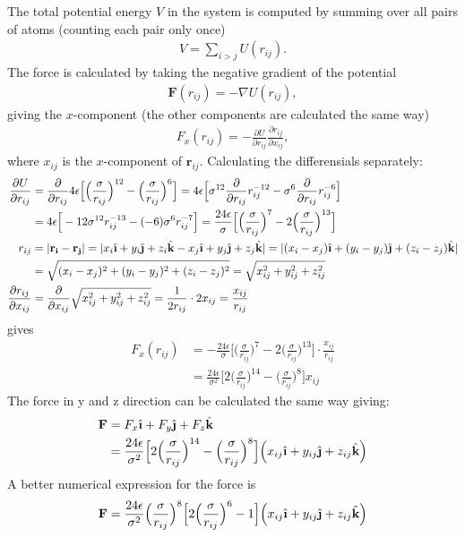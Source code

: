 \documentclass[11pt,a4wide]{article}
\renewcommand{\vec}{\mathbf}
\newcommand{\ihat}{\hat{\textbf{\i}}}
\newcommand{\jhat}{\hat{\textbf{\j}}}
\newcommand{\khat}{\hat{\textbf{k}}}
\begin{document}
The total potential energy $V$ in the system is computed by summing over all pairs of atoms (counting each pair only once)
\begin{align}
	V = \sum_{i>j} U(r_{ij}).
\end{align}
The force is calculated by taking the negative gradient of the potential
\begin{align}
	\vec F(r_{ij}) = -\nabla U(r_{ij}),
\end{align}
giving the $x$-component (the other components are calculated the same way)
\begin{align}
	F_x(r_{ij}) = -\frac{\partial U}{\partial r_{ij}}\frac{\partial r_{ij}}{\partial x_{ij}},
\end{align}
where $x_{ij}$ is the $x$-component of $\vec r_{ij}$. Calculating the differensials separately:
\begin{align*}
\frac{\partial U}{\partial r_{ij}} &= \frac{\partial }{\partial r_{ij}} 4\epsilon\Big[\Big(\frac{\sigma}{r_{ij}}\Big)^{12} - \Big(\frac{\sigma}{r_{ij}}\Big)^6 \Big] =  4\epsilon\Big[ \sigma^{12}\frac{\partial }{\partial r_{ij}} r_{ij}^{-12} - \sigma^6 \frac{\partial }{\partial r_{ij}}r_{ij}^{-6} \Big] \\
&= 4\epsilon\Big[ -12\sigma^{12} r_{ij}^{-13} -(-6) \sigma^6 r_{ij}^{-7} \Big] = \frac{24\epsilon}{\sigma} \Big[\Big(\frac{\sigma}{r_{ij}}\Big)^{7} - 2\Big(\frac{\sigma}{r_{ij}}\Big)^{13} \Big] \\
r_{ij} &= |\vec{r_i} - \vec{r_j} | = | x_i\ihat + y_i\jhat + z_i\khat - x_j\ihat + y_j\jhat + z_j\khat | = | (x_i - x_j)\ihat + (y_i - y_j)\jhat + (z_i - z_j)\khat | \\
&= \sqrt{(x_i - x_j)^2 + (y_i - y_j)^2 + (z_i - z_j)^2} = \sqrt{x_{ij}^2 + y_{ij}^2 + z_{ij}^2} \\
\frac{\partial r_{ij}}{\partial x_{ij}} &= \frac{\partial}{\partial x_{ij}} \sqrt{x_{ij}^2 + y_{ij}^2 + z_{ij}^2} = \frac{1}{2r_{ij}}\cdot 2x_{ij} = \frac{x_{ij}}{r_{ij}}
\end{align*}
gives
\begin{align*}
F_x(r_{ij}) &= -\frac{24\epsilon}{\sigma} \Big[\Big(\frac{\sigma}{r_{ij}}\Big)^{7} - 2\Big(\frac{\sigma}{r_{ij}}\Big)^{13} \Big]\cdot \frac{x_{ij}}{r_{ij}} \\
&= \frac{24\epsilon}{\sigma^2} \Big[2\Big(\frac{\sigma}{r_{ij}}\Big)^{14} - \Big(\frac{\sigma}{r_{ij}}\Big)^{8} \Big]x_{ij}
\end{align*}
The force in y and z direction can be calculated the same way giving:
\begin{align*}
\vec F &= F_x\ihat + F_y \jhat + F_z\khat \\
&= \frac{24\epsilon}{\sigma^2} \Big[2\Big(\frac{\sigma}{r_{ij}}\Big)^{14} - \Big(\frac{\sigma}{r_{ij}}\Big)^{8} \Big]\Big(x_{ij}\ihat + y_{ij}\jhat + z_{ij}\khat \Big)
\end{align*}
A better numerical expression for the force is
\begin{align*}
\vec F = \frac{24\epsilon}{\sigma^2} \Big(\frac{\sigma}{r_{ij}}\Big)^8\Big[2\Big(\frac{\sigma}{r_{ij}}\Big)^{6} - 1 \Big]\Big(x_{ij}\ihat + y_{ij}\jhat + z_{ij}\khat \Big)
\end{align*}
\end{document}
